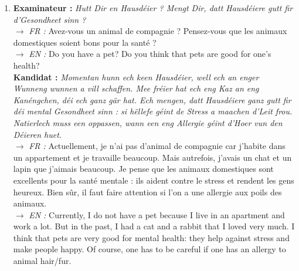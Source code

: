\begin{enumerate}
    \item \textbf{Examinateur :} \textit{Hutt Dir en Hausdéier ? Mengt Dir, datt Hausdéiere gutt fir d'Gesondheet sinn ?} \\
    $\rightarrow$ \textit{FR :} Avez-vous un animal de compagnie ? Pensez-vous que les animaux domestiques soient bons pour la santé ? \\
    $\rightarrow$ \textit{EN :} Do you have a pet? Do you think that pets are good for one's health? \\
    \textbf{Kandidat :} \textit{Momentan hunn ech keen Hausdéier, well ech an enger Wunneng wunnen a vill schaffen. Mee fréier hat ech eng Kaz an eng Kanéngchen, déi ech ganz gär hat. Ech mengen, datt Hausdéiere ganz gutt fir déi mental Gesondheet sinn : si hëllefe géint de Stress a maachen d'Leit frou. Natierlech muss een oppassen, wann een eng Allergie géint d'Hoer vun den Déieren huet.} \\
    $\rightarrow$ \textit{FR :} Actuellement, je n'ai pas d'animal de compagnie car j'habite dans un appartement et je travaille beaucoup. Mais autrefois, j'avais un chat et un lapin que j'aimais beaucoup. Je pense que les animaux domestiques sont excellents pour la santé mentale : ils aident contre le stress et rendent les gens heureux. Bien sûr, il faut faire attention si l'on a une allergie aux poils des animaux. \\
    $\rightarrow$ \textit{EN :} Currently, I do not have a pet because I live in an apartment and work a lot. But in the past, I had a cat and a rabbit that I loved very much. I think that pets are very good for mental health: they help against stress and make people happy. Of course, one has to be careful if one has an allergy to animal hair/fur.

    \vspace{0.4em}


\end{enumerate}
